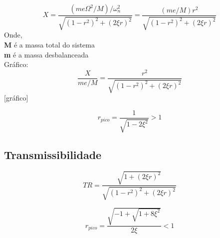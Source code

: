 \documentclass[a4paper, 12pt]{article}
\begin{document}
	\begin{equation}
	\boxed{X = \frac{(me\Omega^2/M)/\omega^2_n}{\sqrt{(1-r^2)^2+(2\xi r)^2}} = \frac{(me/M)r^2}{\sqrt{(1-r^2)^2+(2\xi r)^2}}}
	\end{equation}
	Onde, \\
	\textbf{M} é a massa total do sistema\\
	\textbf{m} é a massa desbalanceada	\\
	
	Gráfico:
	\begin{equation}
	\frac{X}{me/M} = \frac{r^2}{\sqrt{(1-r^2)^2+(2\xi r)^2}}
	\end{equation}
	[gráfico]
	
	\begin{equation}
	\boxed{r_{pico} = \frac{1}{\sqrt{1-2\xi^2}} > 1}
	\end{equation}
	
\subsection{Transmissibilidade}
	\begin{equation}
	\boxed{TR = \frac{\sqrt{1+(2\xi r)^2}}{\sqrt{(1-r^2)^2 + (2\xi r)^2}}}
	\end{equation}
	
	\begin{equation}
	\boxed{r_{pico} = \frac{\sqrt{-1+\sqrt{1+8\xi^2}}}{2\xi} < 1}
	\end{equation}
	
	
	
	
	
	
	
	
	
	
\end{document}
